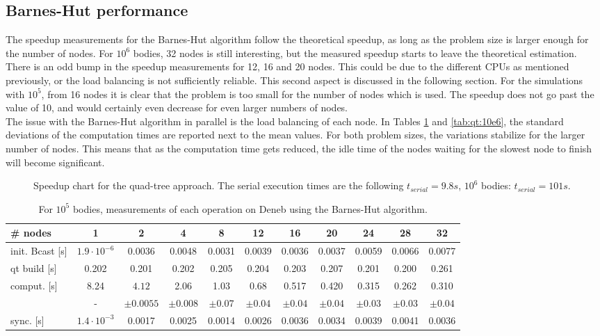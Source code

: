 \subsection{Barnes-Hut performance}
The speedup measurements for the Barnes-Hut algorithm follow the theoretical speedup, as long as the problem size is larger enough for the number of nodes. For $10^6$ bodies, 32 nodes is still interesting, but the measured speedup starts to leave the theoretical estimation. There is an odd bump in the speedup measurements for 12, 16 and 20 nodes. This could be due to the different CPUs as mentioned previously, or the load balancing is not sufficiently reliable. This second aspect is discussed in the following section. For the simulations with $10^5$, from 16 nodes it is clear that the problem is too small for the number of nodes which is used. The speedup does not go past the value of 10, and would certainly even decrease for even larger numbers of nodes.\\
The issue with the Barnes-Hut algorithm in parallel is the load balancing of each node. In Tables \ref{tab:qt:10e5} and \ref{tab:qt:10e6}, the standard deviations of the computation times are reported next to the mean values. For both problem sizes, the variations stabilize for the larger number of nodes. This means that as the computation time gets reduced, the idle time of the nodes waiting for the slowest node to finish will become significant.
\begin{figure}[h]
\centering

\caption{Speedup chart for the quad-tree approach. The serial execution times are the following $t_{serial} = 9.8s$, $10^6$ bodies: $t_{serial} = 101s$.}
\end{figure}

\begin{table}[h]
  \begin{adjustwidth}{-1.5cm}{-1.5cm}       
    \centering
    \begin{tabular}{l|cccccccccc}
      \# nodes & 1 & 2 & 4 & 8 & 12 & 16 & 20 & 24 & 28 & 32\\
      \hline init. Bcast [s] & $1.9\cdot10^{-6}$ & 0.0036 & 0.0048 & 0.0031 & 0.0039 & 0.0036 & 0.0037 & 0.0059 & 0.0066 & 0.0077\\
      qt build [s] & 0.202 & 0.201 & 0.202 & 0.205 & 0.204 & 0.203 &0.207 & 0.201 & 0.200 & 0.261\\
      comput. [s] & 8.24 & $4.12$ & 2.06 & 1.03 &  0.68  & 0.517 &0.420 & 0.315 & 0.262 & 0.310\\
      & - & $\pm 0.0055$ & $\pm 0.008$ & $\pm0.07$ & $\pm 0.04$ & $\pm 0.04$ & $\pm0.04$ & $\pm0.03$ & $\pm0.03$ & $\pm 0.04$ \\
      sync. [s] & $1.4\cdot 10^{-3}$ & 0.0017 & 0.0025 & 0.0014 & 0.0026 &  0.0036& 0.0034 & 0.0039 & 0.0041 & 0.0036\\
    \end{tabular}
    \caption{For $10^5$ bodies, measurements of each operation on Deneb using the Barnes-Hut algorithm.}
    \label{tab:qt:10e5}
  \end{adjustwidth}
\end{table}

